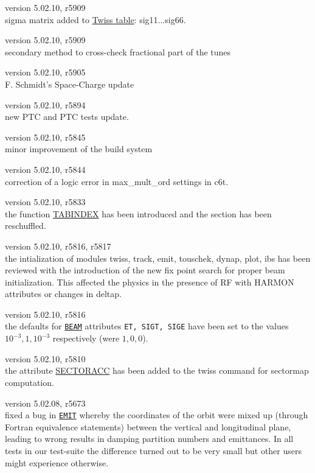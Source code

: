 \begin{madlist}
   version 5.02.10, r5909 \\
   sigma matrix added to \hyperref[chap:twiss]{Twiss table}:  sig11...sig66. 

   version 5.02.10, r5909 \\ 
    secondary method to cross-check fractional part of the tunes 
  
   version 5.02.10, r5905 \\
    F. Schmidt's Space-Charge update 

   version 5.02.10, r5894 \\
    new PTC and PTC tests update.
 
   version 5.02.10, r5845 \\
    minor improvement of the build system
  
   version 5.02.10, r5844  \\
    correction of a logic error in max\_mult\_ord settings in c6t. 

   version 5.02.10, r5833\\
  the function \hyperref[subsubsec:table]{TABINDEX} has been introduced and the section has been reschuffled.

   version 5.02.10, r5816, r5817\\
  the intialization of modules twiss, track, emit, touschek, dynap, plot, ibs has been reviewed with the introduction of the new fix point search for proper beam initialization. This affected the physics in the presence of RF with HARMON attributes or changes in deltap.

   version 5.02.10, r5816\\
  the defaults for \hyperref[sec:beam]{\texttt{BEAM}} attributes \texttt{ET, SIGT, SIGE} have been set to the values $10^{-3}, 1, 10^{-3}$ respectively (were $1, 0, 0$).

   version 5.02.10, r5810\\
  the attribute \hyperref[chap:twiss]{SECTORACC} has been added to the twiss command for sectormap computation.

   version 5.02.08, r5673\\
  fixed a bug in \hyperref[chap:emit]{\texttt{EMIT}} whereby the
  coordinates of the orbit were mixed up (through Fortran equivalence
  statements) between the vertical and longitudinal plane, leading to
  wrong results in damping partition numbers and emittances. In all tests
  in our test-suite the difference turned out to be very small but other
  users might experience otherwise.


\end{madlist}
